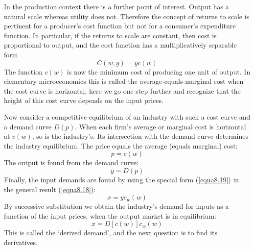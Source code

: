 In the production context there is a further point of interest. Output has a natural scale whereas utility does not. Therefore the concept of returns to scale is pertinent for a producer's cost function but not for a consumer's expenditure function. In particular, if the returns to scale are constant, then cost is proportional to output, and the cost function has a multiplicatively separable form
\begin{equation}  \label{equa8.19}
   C(w,y) = y c(w)
\end{equation}
The function $c(w)$ is now the minimum cost of producing one unit of output. In elementary microeconomics this is called the average-equals-marginal cost when the cost curve is horizontal; here we go one step further and recognize that the height of this cost curve depends on the input prices.

Now consider a competitive equilibrium of an industry with such a cost curve and a demand curve $D(p)$. When each firm's average or marginal cost is horizontal at $c(w)$, so is the industry's. Its intersection with the demand curve determines the industry equilibrium. The price equals the average (equals marginal) cost:
\begin{equation*}   
   p = c(w)
\end{equation*}
The output is found from the demand curve:
\begin{equation*}   
   y = D(p)
\end{equation*}
Finally, the input demands are found by using the special form (\ref{equa8.19}) in the general result (\ref{equa8.18}):
\begin{equation*}   
   x = y c_w(w)
\end{equation*}
By successive substitution we obtain the industry's demand for inputs as a function of the input prices, when the output market is in equilibrium:
\begin{equation} \label{equa8.20}   
   x = D[ c(w) ] c_w(w)
\end{equation}
This is called the `derived demand', and the next question is to find its derivatives.

